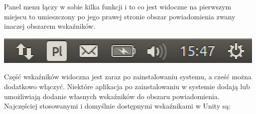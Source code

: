 \textcolor{ubuntu_orange}{Panel menu} łączy w sobie kilka funkcji i to co jest widoczne na pierwszym miejscu to umieszczony po jego prawej stronie \textcolor{ubuntu_orange}{obszar powiadomienia} zwany inaczej obszarem wskaźników.

\begin{center}
	\includegraphics[width=\linewidth]{images/unity_menu_bar.png}
\end{center}

Część wskaźników widoczna jest zaraz po zainstalowaniu systemu, a cześć można dodatkowo włączyć. Niektóre aplikacja po zainstalowaniu w systemie dodają lub umożliwiają dodanie własnych wskaźników do obszaru powiadomienia. Najczęściej stosowanymi i domyślnie dostępnymi wskaźnikami w Unity są:
